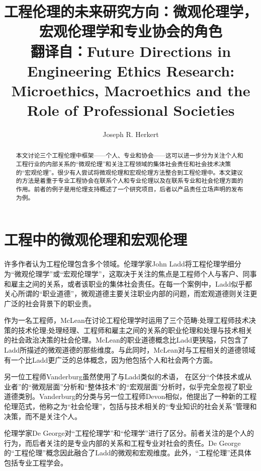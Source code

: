 \documentclass[lang=cn,11pt,a4paper]{elegantpaper}
\title{工程伦理的未来研究方向：微观伦理学，宏观伦理学和专业协会的角色 \\ 翻译自：Future Directions in Engineering Ethics Research: Microethics, Macroethics and the Role of Professional Societies}
\author{Joseph R. Herkert}
\institute{North Carolina State University, USA}
\date{}
\begin{document}
\maketitle
\thispagestyle{fancy}         %
\fancyhead{}                     %
\lfoot{}
\cfoot{\thepage}  %
\rfoot{}
\renewcommand{\headrulewidth}{0pt}      %
\renewcommand{\footrulewidth}{0pt}

\begin{abstract}
本文讨论三个工程伦理中框架——个人、专业和协会——这可以进一步分为关注个人和工程行业的内部关系的“微观伦理”和关注工程领域的集体社会责任和社会技术决策的“宏观伦理”。很少有人尝试将微观伦理和宏观伦理方法整合到工程伦理中。本文建议的方法是着重于专业工程协会在联系个人和专业伦理以及在联系专业和社会伦理方面的作用。前者的例子是用伦理支持概述了一个研究项目，后者以产品责任立场声明的发布为例。
\end{abstract}



\section{工程中的微观伦理和宏观伦理\cite{1,2}}
许多作者认为工程伦理包含多个领域。伦理学家John Ladd\cite{3}将工程伦理学细分为“微观伦理学”或“宏观伦理学”，这取决于关注的焦点是工程师个人与客户、同事和雇主之间的关系，或者该职业的集体社会责任。在每一个案例中，Ladd似乎都关心所谓的“职业道德”，微观道德主要关注职业内部的问题，而宏观道德则关注更广泛的社会背景下的职业责。

作为一名工程师，McLean\cite{4}在讨论工程伦理学时运用了三个范畴:处理工程师技术决策的技术伦理;处理经理、工程师和雇主之间的关系的职业伦理和处理与技术相关的社会政治决策的社会伦理。McLean的职业道德概念比Ladd更狭隘，只包含了Ladd所描述的微观道德的那些维度。与此同时，McLean对与工程相关的道德领域有一个比Ladd更广泛的总体概念，因为他包括个人和社会两个方面。

另一位工程师Vanderburg\cite{5}虽然使用了与Ladd类似的术语，
在区分“个体技术或从业者”的“微观层面”分析和“整体技术”的“宏观层面”分析时，似乎完全忽视了职业道德类别。Vanderburg的分类与另一位工程师Devon相似，\cite{6}他提出了一种新的工程伦理范式，他称之为“社会伦理”，包括与技术相关的“专业知识的社会关系”管理和决策，而不是关注个人。

伦理学家De George\cite{7}对“工程伦理学”和“伦理学”进行了区分。前者关注的是个人的行为，而后者关注的是专业内部的关系和工程专业对社会的责任。De George的“工程伦理”概念因此融合了Ladd的微观和宏观维度。此外，“工程伦理”还具体包括专业工程学会。
\end{document}
